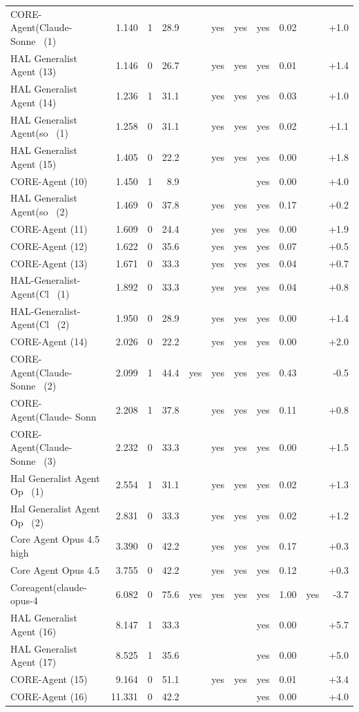 {\begin{longtable}{lrrrcccccrr}
CORE-Agent(Claude-Sonne~ (1) & 1.140 & 1 & 28.9 &  & yes & yes & yes & 0.02 &  & +1.0 \\
HAL Generalist Agent (13) & 1.146 & 0 & 26.7 &  & yes & yes & yes & 0.01 &  & +1.4 \\
HAL Generalist Agent (14) & 1.236 & 1 & 31.1 &  & yes & yes & yes & 0.03 &  & +1.0 \\
HAL Generalist Agent(so~ (1) & 1.258 & 0 & 31.1 &  & yes & yes & yes & 0.02 &  & +1.1 \\
HAL Generalist Agent (15) & 1.405 & 0 & 22.2 &  & yes & yes & yes & 0.00 &  & +1.8 \\
CORE-Agent (10) & 1.450 & 1 & 8.9 &  &  &  & yes & 0.00 &  & +4.0 \\
HAL Generalist Agent(so~ (2) & 1.469 & 0 & 37.8 &  & yes & yes & yes & 0.17 &  & +0.2 \\
CORE-Agent (11) & 1.609 & 0 & 24.4 &  & yes & yes & yes & 0.00 &  & +1.9 \\
CORE-Agent (12) & 1.622 & 0 & 35.6 &  & yes & yes & yes & 0.07 &  & +0.5 \\
CORE-Agent (13) & 1.671 & 0 & 33.3 &  & yes & yes & yes & 0.04 &  & +0.7 \\
HAL-Generalist-Agent(Cl~ (1) & 1.892 & 0 & 33.3 &  & yes & yes & yes & 0.04 &  & +0.8 \\
HAL-Generalist-Agent(Cl~ (2) & 1.950 & 0 & 28.9 &  & yes & yes & yes & 0.00 &  & +1.4 \\
CORE-Agent (14) & 2.026 & 0 & 22.2 &  & yes & yes & yes & 0.00 &  & +2.0 \\
CORE-Agent(Claude-Sonne~ (2) & 2.099 & 1 & 44.4 & yes & yes & yes & yes & 0.43 &  & -0.5 \\
CORE-Agent(Claude- Sonn~ & 2.208 & 1 & 37.8 &  & yes & yes & yes & 0.11 &  & +0.8 \\
CORE-Agent(Claude-Sonne~ (3) & 2.232 & 0 & 33.3 &  & yes & yes & yes & 0.00 &  & +1.5 \\
Hal Generalist Agent Op~ (1) & 2.554 & 1 & 31.1 &  & yes & yes & yes & 0.02 &  & +1.3 \\
Hal Generalist Agent Op~ (2) & 2.831 & 0 & 33.3 &  & yes & yes & yes & 0.02 &  & +1.2 \\
Core Agent Opus 4.5 high & 3.390 & 0 & 42.2 &  & yes & yes & yes & 0.17 &  & +0.3 \\
Core Agent Opus 4.5 & 3.755 & 0 & 42.2 &  & yes & yes & yes & 0.12 &  & +0.3 \\
Coreagent(claude-opus-4~ & 6.082 & 0 & 75.6 & yes & yes & yes & yes & 1.00 & yes & -3.7 \\
HAL Generalist Agent (16) & 8.147 & 1 & 33.3 &  &  &  & yes & 0.00 &  & +5.7 \\
HAL Generalist Agent (17) & 8.525 & 1 & 35.6 &  &  &  & yes & 0.00 &  & +5.0 \\
CORE-Agent (15) & 9.164 & 0 & 51.1 &  & yes & yes & yes & 0.01 &  & +3.4 \\
CORE-Agent (16) & 11.331 & 0 & 42.2 &  &  &  & yes & 0.00 &  & +4.0 \\
\end{longtable}

}
